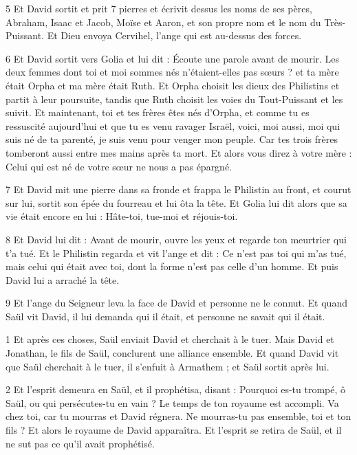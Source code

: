 \par 5 Et David sortit et prit 7 pierres et écrivit dessus les noms de ses pères, Abraham, Isaac et Jacob, Moïse et Aaron, et son propre nom et le nom du Très-Puissant. Et Dieu envoya Cervihel, l'ange qui est au-dessus des forces.

\par 6 Et David sortit vers Golia et lui dit : Écoute une parole avant de mourir. Les deux femmes dont toi et moi sommes nés n'étaient-elles pas sœurs ? et ta mère était Orpha et ma mère était Ruth. Et Orpha choisit les dieux des Philistins et partit à leur poursuite, tandis que Ruth choisit les voies du Tout-Puissant et les suivit. Et maintenant, toi et tes frères êtes nés d'Orpha, et comme tu es ressuscité aujourd'hui et que tu es venu ravager Israël, voici, moi aussi, moi qui suis né de ta parenté, je suis venu pour venger mon peuple. Car tes trois frères tomberont aussi entre mes mains après ta mort. Et alors vous direz à votre mère : Celui qui est né de votre sœur ne nous a pas épargné.

\par 7 Et David mit une pierre dans sa fronde et frappa le Philistin au front, et courut sur lui, sortit son épée du fourreau et lui ôta la tête. Et Golia lui dit alors que sa vie était encore en lui : Hâte-toi, tue-moi et réjouis-toi.

\par 8 Et David lui dit : Avant de mourir, ouvre les yeux et regarde ton meurtrier qui t'a tué. Et le Philistin regarda et vit l'ange et dit : Ce n'est pas toi qui m'as tué, mais celui qui était avec toi, dont la forme n'est pas celle d'un homme. Et puis David lui a arraché la tête.

\par 9 Et l'ange du Seigneur leva la face de David et personne ne le connut. Et quand Saül vit David, il lui demanda qui il était, et personne ne savait qui il était.


\par 1 Et après ces choses, Saül enviait David et cherchait à le tuer. Mais David et Jonathan, le fils de Saül, conclurent une alliance ensemble. Et quand David vit que Saül cherchait à le tuer, il s'enfuit à Armathem ; et Saül sortit après lui.

\par 2 Et l'esprit demeura en Saül, et il prophétisa, disant : Pourquoi es-tu trompé, ô Saül, ou qui persécutes-tu en vain ? Le temps de ton royaume est accompli. Va chez toi, car tu mourras et David régnera. Ne mourras-tu pas ensemble, toi et ton fils ? Et alors le royaume de David apparaîtra. Et l'esprit se retira de Saül, et il ne sut pas ce qu'il avait prophétisé.

